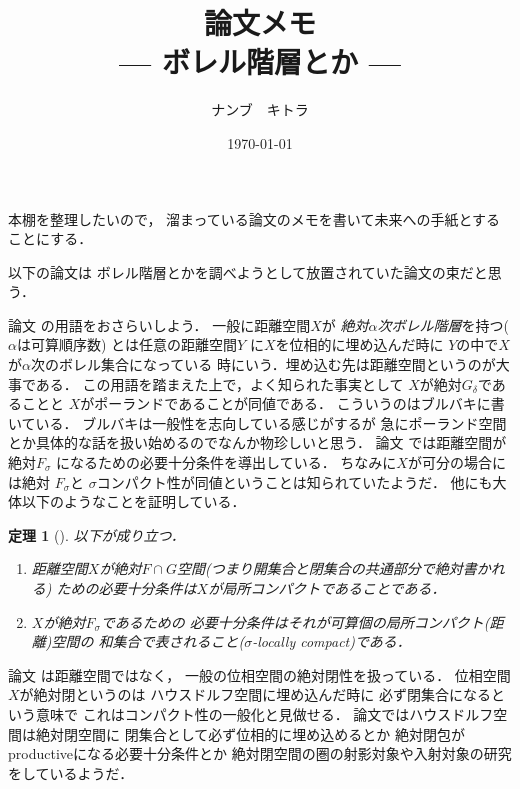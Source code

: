 \documentclass[leqno, a4paper, 12pt]{jsarticle}
\title{論文メモ
\large{\\--- ボレル階層とか ---}
}
\author{ナンブ　キトラ}
\date{\today}
\newtheorem{thm}{定理}
\begin{document}
\maketitle

本棚を整理したいので，
溜まっている論文のメモを書いて未来への手紙とすることにする．

以下の論文は
ボレル階層とかを調べようとして放置されていた論文の束だと思う．



論文
\cite{MR0138088}の用語をおさらいしよう．
一般に距離空間$X$が
\emph{絶対$\alpha$次ボレル階層}を持つ($\alpha$は可算順序数)
とは任意の距離空間$Y$
に$X$を位相的に埋め込んだ時に
$Y$の中で$X$が$\alpha$次のボレル集合になっている
時にいう．埋め込む先は距離空間というのが大事である．
この用語を踏まえた上で，よく知られた事実として
$X$が絶対$G_{\delta}$であることと
$X$がポーランドであることが同値である．
こういうのはブルバキに書いている．
ブルバキは一般性を志向している感じがするが
急にポーランド空間とか具体的な話を扱い始めるのでなんか物珍しいと思う．
論文
\cite{MR0138088}
では距離空間が絶対$F_{\sigma}$
になるための必要十分条件を導出している．
ちなみに$X$が可分の場合には絶対
$F_{\sigma}$と
$\sigma$コンパクト性が同値ということは知られていたようだ．
他にも大体以下のようなことを証明している．
\begin{thm}[\cite{MR0138088}]
以下が成り立つ．
\begin{enumerate}[label=\textup{(\arabic*)}]
\item 
距離空間$X$が絶対$F\cap G$空間(つまり開集合と閉集合の共通部分で絶対書かれる)
ための必要十分条件は$X$が局所コンパクトであることである．

\item 
$X$が絶対$F_{\sigma}$であるための
必要十分条件はそれが可算個の局所コンパクト(距離)空間の
和集合で表されること($\sigma$-locally compact)である．
\end{enumerate}
\end{thm}


論文
\cite{MR0219024}
は距離空間ではなく，
一般の位相空間の絶対閉性を扱っている．
位相空間$X$が絶対閉というのは
ハウスドルフ空間に埋め込んだ時に
必ず閉集合になるという意味で
これはコンパクト性の一般化と見做せる．
論文ではハウスドルフ空間は絶対閉空間に
閉集合として必ず位相的に埋め込めるとか
絶対閉包がproductiveになる必要十分条件とか
絶対閉空間の圏の射影対象や入射対象の研究をしているようだ．
\end{document}
